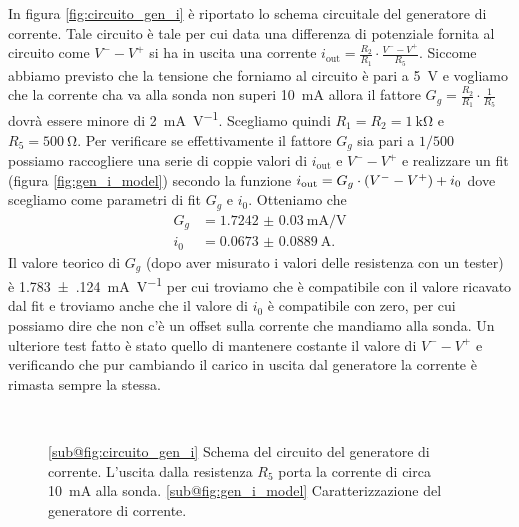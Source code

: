 \documentclass[
    prl,
    reprint, 
    superscriptaddress, 
    altaffilletter, 
    amsmath, 
    amssymb, 
    a4paper,
    varvw]{revtex4-2}
\begin{document}
In figura \ref{fig:circuito_gen_i} è riportato lo schema circuitale del generatore di corrente. Tale circuito è tale per cui data una differenza di potenziale fornita al circuito come $V^{-}-V^{+}$ si ha in uscita una corrente $i_\text{out}=\frac{R_2}{R_1}\cdot \frac{V^--V^+}{R_5}$. Siccome abbiamo previsto che la tensione che forniamo al circuito è pari a \SI{5}{\volt} e vogliamo che la corrente cha va alla sonda non superi \SI{10}{\milli\ampere} allora il fattore $G_g=\frac{R_2}{R_1}\cdot\frac{1}{R_5}$ dovrà essere minore di \SI{2}{\milli\ampere\per\volt}. Scegliamo quindi $R_{1}=R_{2}=\SI{1}{\kilo\ohm}$ e $R_{5}=\SI{500}{\ohm}$. Per verificare se effettivamente il fattore $G_g$ sia pari a $1/500$ possiamo raccogliere una serie di coppie valori di $i_\text{out}$ e $V^{-}-V^{+}$ e realizzare un fit (figura \ref{fig:gen_i_model}) secondo la funzione $i_\text{out}=G_g\cdot \qty(V^--V^+) + i_0$ dove scegliamo come parametri di fit $G_{g}$ e $i_0$. Otteniamo che \begin{align*}
    G_g &=\SI{1.7242(300)}{\milli\ampere \per\volt}\\
    i_0 &= \SI{0.0673(889)}{\ampere}.
\end{align*} Il valore teorico di $G_g$ (dopo aver misurato i valori delle resistenza con un tester) è \SI{1.783(124)}{\milli\ampere\per\volt} per cui troviamo che è compatibile con il valore ricavato dal fit e troviamo anche che il valore di $i_0$ è compatibile con zero, per cui possiamo dire che non c'è un offset sulla corrente che mandiamo alla sonda.
Un ulteriore test fatto è stato quello di mantenere costante il valore di $V^--V^+$ e verificando che pur cambiando il carico in uscita dal generatore la corrente è rimasta sempre la stessa.

\begin{figure}
    \centering
    \\
    \caption{
        \ref{sub@fig:circuito_gen_i} Schema del circuito del generatore di corrente. L'uscita dalla resistenza $R_5$ porta la corrente di circa \SI{10}{\milli\ampere} alla sonda.
        \ref{sub@fig:gen_i_model} Caratterizzazione del generatore di corrente. 
    }
\end{figure}

\end{document}
